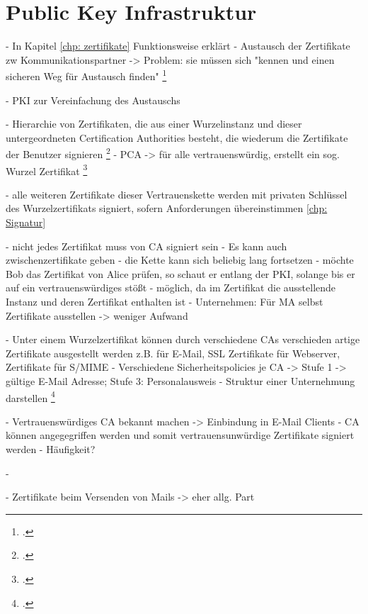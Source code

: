 \chapter{Public Key Infrastruktur}

- In Kapitel \ref*{chp: zertifikate} Funktionsweise erklärt
- Austausch der Zertifikate zw Kommunikationspartner -> Problem: sie müssen sich "kennen und einen sicheren Weg für Austausch finden" \footcite{BSI}

- PKI zur Vereinfachung des Austauschs

- Hierarchie von Zertifikaten, die aus einer Wurzelinstanz und dieser untergeordneten Certification Authorities besteht, die wiederum die Zertifikate der Benutzer signieren \footcite[Vgl.][]{Schwenk, S23}
- PCA -> für alle vertrauenswürdig, erstellt ein sog. Wurzel Zertifikat \footcite[Vgl. ][]{ITWissen2012}

- alle weiteren Zertifikate dieser Vertrauenskette werden mit privaten Schlüssel des Wurzelzertifikats signiert, sofern Anforderungen übereinstimmen \ref{chp: Signatur}


- nicht jedes Zertifikat muss von CA signiert sein
- Es kann auch zwischenzertifikate geben
- die Kette kann sich beliebig lang fortsetzen
- möchte Bob das Zertifikat von Alice prüfen, so schaut er entlang der PKI, solange bis er auf ein vertrauenswürdiges stößt
- möglich, da im Zertifikat die ausstellende Instanz und deren Zertifikat enthalten ist
- Unternehmen: Für MA selbst Zertifikate ausstellen -> weniger Aufwand

- Unter einem Wurzelzertifikat können durch verschiedene CAs verschieden artige Zertifikate ausgestellt werden z.B. für E-Mail, SSL Zertifikate für Webserver, Zertifikate für S/MIME
- Verschiedene Sicherheitspolicies je CA -> Stufe 1 -> gültige E-Mail Adresse; Stufe 3: Personalausweis
- Struktur einer Unternehmung darstellen
\footcite[Vgl.][]{Schwenk, S24}

- Vertrauenswürdiges CA bekannt machen -> Einbindung in E-Mail Clients
- CA können angegegriffen werden und somit vertrauensunwürdige Zertifikate signiert werden
- Häufigkeit?

-

- Zertifikate beim Versenden von Mails -> eher allg. Part


